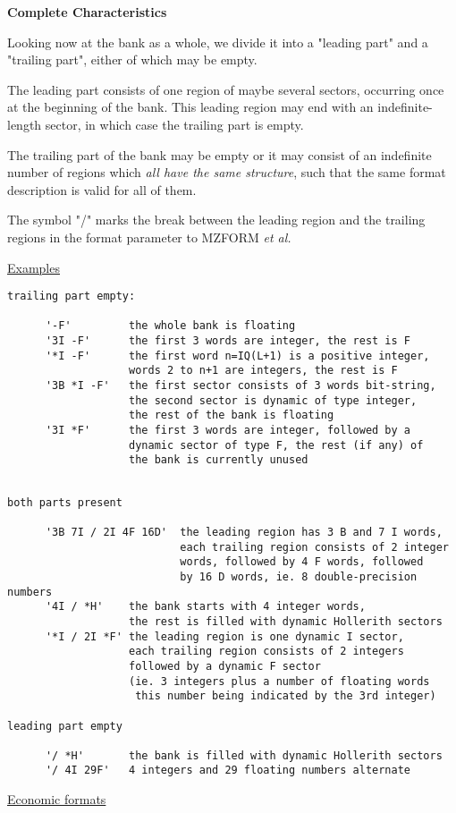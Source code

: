 \vspace{4mm}
{\large\bf Complete Characteristics}

Looking now at the bank as a whole,
we divide it into a "leading part" and a "trailing part",
either of which may be empty.

The leading part consists of one region of maybe several sectors,
occurring once at the beginning of the bank.
This leading region may end with an indefinite-length sector,
in which case the trailing part is empty.

The trailing part of the bank may be empty or it may consist
of an indefinite number of regions which
{\em all have the same structure},
such that the same format description is valid for all of them.

The symbol "/" marks the break between the leading region
and the trailing regions in the format parameter to MZFORM {\it et al.}

\ul{Examples}
\begin{verbatim}
trailing part empty:

      '-F'         the whole bank is floating
      '3I -F'      the first 3 words are integer, the rest is F
      '*I -F'      the first word n=IQ(L+1) is a positive integer,
                   words 2 to n+1 are integers, the rest is F
      '3B *I -F'   the first sector consists of 3 words bit-string,
                   the second sector is dynamic of type integer,
                   the rest of the bank is floating
      '3I *F'      the first 3 words are integer, followed by a
                   dynamic sector of type F, the rest (if any) of
                   the bank is currently unused
\end{verbatim} 

\begin{verbatim}

both parts present

      '3B 7I / 2I 4F 16D'  the leading region has 3 B and 7 I words,
                           each trailing region consists of 2 integer
                           words, followed by 4 F words, followed
                           by 16 D words, ie. 8 double-precision numbers
      '4I / *H'    the bank starts with 4 integer words,
                   the rest is filled with dynamic Hollerith sectors
      '*I / 2I *F' the leading region is one dynamic I sector,
                   each trailing region consists of 2 integers
                   followed by a dynamic F sector
                   (ie. 3 integers plus a number of floating words
                    this number being indicated by the 3rd integer)

leading part empty

      '/ *H'       the bank is filled with dynamic Hollerith sectors
      '/ 4I 29F'   4 integers and 29 floating numbers alternate
\end{verbatim} 
\cleardoublepage  %
\ul{Economic formats}

